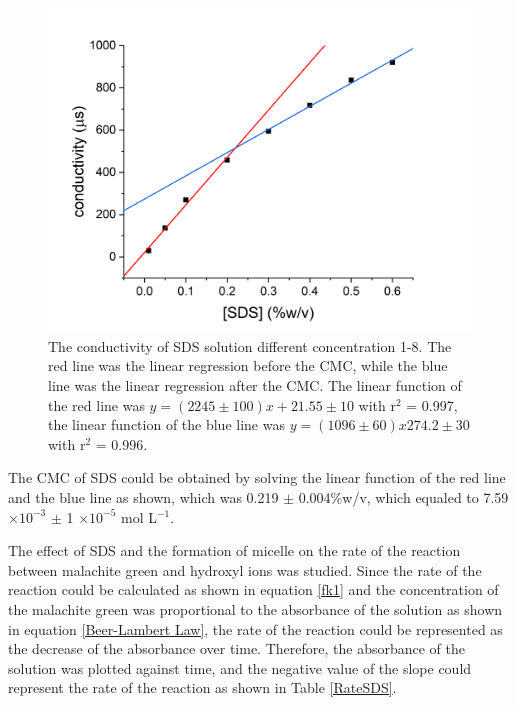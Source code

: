 \documentclass[twocolumn]{article} %
\begin{document}
\begin{figure}[H]
    \centering
    \includegraphics[width=\columnwidth]{part2 CMC.png}
    \caption{The conductivity of SDS solution different concentration 1-8. The red line was the linear regression before the CMC, while the blue line was the linear regression after the CMC. The linear function of the red line was $y= (2245 \pm 100) x + 21.55 \pm 10$ with r$^2$ = 0.997, the linear function of the blue line was $y= (1096 \pm 60) x 274.2 \pm 30$ with r$^2$ = 0.996.}
    \label{conductivity}
\end{figure}

The CMC of SDS could be obtained by solving the linear function of the red line and the blue line as shown, which was 0.219 $\pm$ 0.004\%w/v, which equaled to 7.59 $\times 10^{-3}$ $\pm$ 1 $\times 10^{-5}$ mol L$^{-1}$.

The effect of SDS and the formation of micelle on the rate of the reaction between malachite green and hydroxyl ions was studied. Since the rate of the reaction could be calculated as shown in equation \ref{fk1} and the concentration of the malachite green was proportional to the absorbance of the solution as shown in equation \ref{Beer-Lambert Law}, the rate of the reaction could be represented as the decrease of the absorbance over time. Therefore, the absorbance of the solution was plotted against time, and the negative value of the slope could represent the rate of the reaction as shown in Table \ref{RateSDS}.
\end{document}
